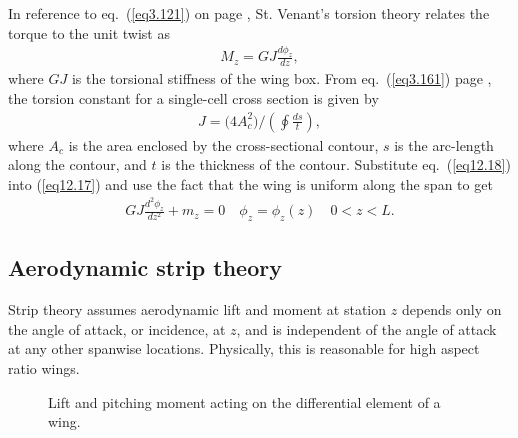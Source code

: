 \documentclass{AeroStructure-ERJohnson}
\begin{document}
In reference to eq.~(\ref{eq3.121}) on page \pageref{eq3.121}, St. Venant's torsion theory relates the torque to the unit twist as
\begin{align}\label{eq12.18}
M_{z}=G J \frac{d \phi_{z}}{d z},
\end{align}
where $GJ$ is the torsional stiffness of the wing box. From eq.~(\ref{eq3.161}) page \pageref{eq3.161}, the torsion constant for a single-cell cross section is given by
\begin{align}\label{eq12.19}
J=\big(4 A_{c}^{2}\big) /\left(\oint \frac{d s}{t}\right),
\end{align}
where $A_{c}$ is the area enclosed by the cross-sectional contour, $s$ is the arc-length along the contour, and $t$ is the thickness of the contour. Substitute eq.~(\ref{eq12.18}) into (\ref{eq12.17}) and use the fact that the wing is uniform along the span to get
\begin{align}\label{eq12.20}
G J \frac{d^{2} \phi_{z}}{d z^{2}}+m_{z}=0 \quad \phi_{z}=\phi_{z}(z) \quad 0<z<L.
\end{align}

\subsection{Aerodynamic strip theory}\label{sec12.3.1}

Strip theory assumes aerodynamic lift and moment at station $z$ depends only on the angle of attack, or incidence, at $z$, and is independent of the angle of attack at any other spanwise locations. Physically, this is reasonable for high aspect ratio wings\vadjust{\vspace*{8pt}\pagebreak}.

{\def\thefigure{12.7}
\begin{figure}
\caption{Lift and pitching moment acting on the differential element of a wing.\label{fig12.7}}
\end{figure}
}
\end{document}

